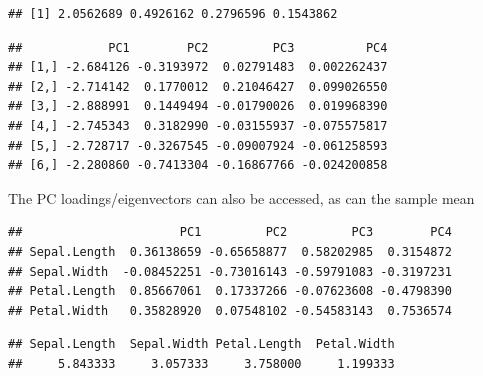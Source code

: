 \documentclass[]{book}
\newenvironment{Shaded}{\begin{snugshade}}{\end{snugshade}}
\newcommand{\CommentTok}[1]{\textcolor[rgb]{0.56,0.35,0.01}{\textit{#1}}}
\newcommand{\KeywordTok}[1]{\textcolor[rgb]{0.13,0.29,0.53}{\textbf{#1}}}
\newcommand{\NormalTok}[1]{#1}
\newcommand{\OperatorTok}[1]{\textcolor[rgb]{0.81,0.36,0.00}{\textbf{#1}}}
\theoremstyle{definition}
\theoremstyle{definition}
\theoremstyle{definition}
\theoremstyle{remark}
\begin{document}
\begin{verbatim}
## [1] 2.0562689 0.4926162 0.2796596 0.1543862
\end{verbatim}

\begin{Shaded}
\end{Shaded}

\begin{verbatim}
##            PC1        PC2         PC3          PC4
## [1,] -2.684126 -0.3193972  0.02791483  0.002262437
## [2,] -2.714142  0.1770012  0.21046427  0.099026550
## [3,] -2.888991  0.1449494 -0.01790026  0.019968390
## [4,] -2.745343  0.3182990 -0.03155937 -0.075575817
## [5,] -2.728717 -0.3267545 -0.09007924 -0.061258593
## [6,] -2.280860 -0.7413304 -0.16867766 -0.024200858
\end{verbatim}

The PC loadings/eigenvectors can also be accessed, as can the sample mean

\begin{Shaded}
\end{Shaded}

\begin{verbatim}
##                      PC1         PC2         PC3        PC4
## Sepal.Length  0.36138659 -0.65658877  0.58202985  0.3154872
## Sepal.Width  -0.08452251 -0.73016143 -0.59791083 -0.3197231
## Petal.Length  0.85667061  0.17337266 -0.07623608 -0.4798390
## Petal.Width   0.35828920  0.07548102 -0.54583143  0.7536574
\end{verbatim}

\begin{Shaded}
\end{Shaded}

\begin{verbatim}
## Sepal.Length  Sepal.Width Petal.Length  Petal.Width 
##     5.843333     3.057333     3.758000     1.199333
\end{verbatim}
\end{document}
